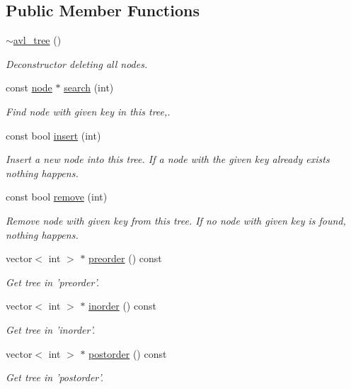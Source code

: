 \subsection*{Public Member Functions}
\begin{DoxyCompactItemize}
\item 
\hypertarget{classavl__tree_aae7f6a688cb231f6ddbfa486f61b18f4}{\hyperlink{classavl__tree_aae7f6a688cb231f6ddbfa486f61b18f4}{$\sim$avl\-\_\-tree} ()}\label{classavl__tree_aae7f6a688cb231f6ddbfa486f61b18f4}

\begin{DoxyCompactList}\small\item\em Deconstructor deleting all nodes. \end{DoxyCompactList}\item 
const \hyperlink{structavl__tree_1_1node}{node} $\ast$ \hyperlink{classavl__tree_a7554d1333ab18cdb9472bdfab183bf28}{search} (int)
\begin{DoxyCompactList}\small\item\em Find node with given key in this tree,. \end{DoxyCompactList}\item 
const bool \hyperlink{classavl__tree_a671d955359a56db67f09bc5dea32201a}{insert} (int)
\begin{DoxyCompactList}\small\item\em Insert a new node into this tree. If a node with the given key already exists nothing happens. \end{DoxyCompactList}\item 
const bool \hyperlink{classavl__tree_a6ea8ac86887224e777c3531d5fa347f8}{remove} (int)
\begin{DoxyCompactList}\small\item\em Remove node with given key from this tree. If no node with given key is found, nothing happens. \end{DoxyCompactList}\item 
vector$<$ int $>$ $\ast$ \hyperlink{classavl__tree_a54d8bd6f3b5d23e9c6ed2ca3046e2f51}{preorder} () const 
\begin{DoxyCompactList}\small\item\em Get tree in 'preorder'. \end{DoxyCompactList}\item 
vector$<$ int $>$ $\ast$ \hyperlink{classavl__tree_a9c35affd0642ddd8fa6e1bea92e9dfb9}{inorder} () const 
\begin{DoxyCompactList}\small\item\em Get tree in 'inorder'. \end{DoxyCompactList}\item 
vector$<$ int $>$ $\ast$ \hyperlink{classavl__tree_a153a69d4bfe9952ec59c18c76cb5932d}{postorder} () const 
\begin{DoxyCompactList}\small\item\em Get tree in 'postorder'. \end{DoxyCompactList}\end{DoxyCompactItemize}


